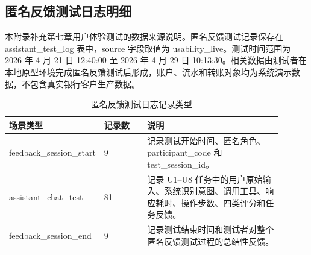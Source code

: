 \documentclass[bachelor, print]{xduthesis}
\begin{document}
\begin{appendix}
\section{匿名反馈测试日志明细}
\label{app:usability-log-details}

本附录补充第七章用户体验测试的数据来源说明。匿名反馈测试记录保存在 assistant\_test\_log 表中，source 字段取值为 usability\_live。测试时间范围为 2026 年 4 月 21 日 12:40:00 至 2026 年 4 月 29 日 10:13:30。相关数据由测试者在本地原型环境完成匿名反馈测试后形成，账户、流水和转账对象均为系统演示数据，不包含真实银行客户生产数据。

\begin{table}[H]
    \centering
    \caption{匿名反馈测试日志记录类型}
    \label{tab:usability-log-scenario-appendix}
    \small
    \setlength{\tabcolsep}{4pt}
    \begin{tabular}{|p{0.24\linewidth}|p{0.16\linewidth}|p{0.5\linewidth}|}
        \hline
        场景类型 & 记录数 & 说明 \\
        \hline
        feedback\_session\_start & 9 & 记录测试开始时间、匿名角色、participant\_code 和 test\_session\_id。 \\
        \hline
        assistant\_chat\_test & 81 & 记录 U1--U8 任务中的用户原始输入、系统识别意图、调用工具、响应耗时、操作步数、四类评分和任务反馈。 \\
        \hline
        feedback\_session\_end & 9 & 记录测试结束时间和测试者对整个匿名反馈测试过程的总结性反馈。 \\
        \hline
    \end{tabular}
\end{table}


\end{appendix}
\end{document}
